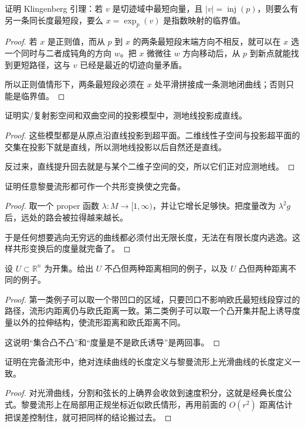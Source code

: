 \documentclass[11pt,a4paper,openany]{ctexbook}
\numberwithin{equation}{chapter}
\begin{document}
\begin{exercise}
证明 Klingenberg 引理：若 \(v\) 是切迹域中最短向量，且 \(|v|=\operatorname{inj}(p)\)，则要么有另一条同长度最短段，要么 \(x=\exp_p(v)\) 是指数映射的临界值。
\end{exercise}
\begin{proof}
若 \(x\) 是正则值，而从 \(p\) 到 \(x\) 的两条最短段末端方向不相反，就可以在 \(x\) 选一个同时与二者成钝角的方向 \(w\)。把 \(x\) 微微往 \(w\) 方向移动后，从 \(p\) 到新点就能找到更短路径，这与 \(v\) 已经是最近的切迹向量矛盾。

所以正则值情形下，两条最短段必须在 \(x\) 处平滑拼接成一条测地闭曲线；否则只能是临界值。
\end{proof}

\begin{exercise}
证明实/复射影空间和双曲空间的投影模型中，测地线投影成直线。
\end{exercise}
\begin{proof}
这些模型都是从原点沿直线投影到超平面。二维线性子空间与投影超平面的交集在投影下就是直线，所以测地线投影以后自然还是直线。

反过来，直线提升回去就是与某个二维子空间的交，所以它们正对应测地线。
\end{proof}

\begin{exercise}
证明任意黎曼流形都可作一个共形变换使之完备。
\end{exercise}
\begin{proof}
取一个 proper 函数 \(\lambda\colon M\to [1,\infty)\)，并让它增长足够快。把度量改为 \(\lambda^2 g\) 后，远处的路会被拉得越来越长。

于是任何想要逃向无穷远的曲线都必须付出无限长度，无法在有限长度内逃逸。这样共形变换后的度量就完备了。
\end{proof}

\begin{exercise}
设 \(U\subset\mathbb R^n\) 为开集。给出 \(U\) 不凸但两种距离相同的例子，以及 \(U\) 凸但两种距离不同的例子。
\end{exercise}
\begin{proof}
第一类例子可以取一个带凹口的区域，只要凹口不影响欧氏最短线段穿过的路径，流形内距离仍与欧氏距离一致。第二类例子可以取一个凸开集并配上诱导度量以外的拉伸结构，使流形距离和欧氏距离不同。

这说明“集合凸不凸”和“度量是不是欧氏诱导”是两回事。
\end{proof}

\begin{exercise}
证明在完备流形中，绝对连续曲线的长度定义与黎曼流形上光滑曲线的长度定义一致。
\end{exercise}
\begin{proof}
对光滑曲线，分割和弦长的上确界会收敛到速度积分，这就是经典长度公式。黎曼流形上在局部用正规坐标近似欧氏情形，再用前面的 \(O(r^2)\) 距离估计把误差控制住，就可把同样的结论搬过去。
\end{proof}
\end{document}
